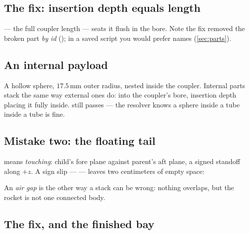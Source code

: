 
\subsection*{The fix: insertion depth equals length}



 --- the full coupler length --- seats it flush in the bore.
Note the fix removed the broken part \emph{by id} (); in a
saved script you would prefer names (\cref{sec:parts}).

\subsection*{An internal payload}



A hollow sphere, $17.5$\,mm outer radius, nested inside the coupler. Internal
parts stack the same way external ones do:  into the
coupler's bore, insertion depth placing it fully inside. 
still passes --- the resolver knows a sphere inside a tube inside a tube is
fine.

\subsection*{Mistake two: the floating tail}

 means \emph{touching}: child's fore plane against parent's aft
plane,  a signed standoff along $+z$. A sign slip ---
 --- leaves two centimeters of empty space:



An \emph{air gap} is the other way a stack can be wrong: nothing overlaps, but
the rocket is not one connected body.

\subsection*{The fix, and the finished bay}



